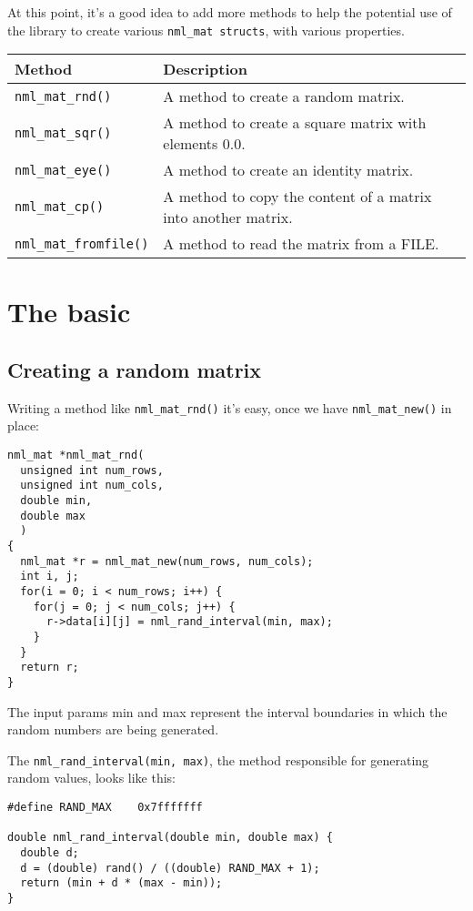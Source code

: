 At this point, it’s a good idea to add more methods to help the potential use of the library to create various {\tt nml\_mat structs}, with various properties.
\\

\begin{tabular}{l@{\quad}l}
Method & 	Description 
\\
\hline 
{\tt nml\_mat\_rnd()} & A method to create a random matrix.
\\
{\tt nml\_mat\_sqr()} & A method to create a square matrix with elements 0.0.
\\
{\tt nml\_mat\_eye()} & A method to create an identity matrix.
\\
{\tt nml\_mat\_cp()} & A method to copy the content of a matrix into another matrix.
\\
{\tt nml\_mat\_fromfile()} & A method to read the matrix from a FILE.
\end{tabular}

\section{The basic}

\subsection{Creating a random matrix}

Writing a method like {\tt nml\_mat\_rnd()} it’s easy, once we have {\tt nml\_mat\_new()} in place:

\begin{verbatim}
nml_mat *nml_mat_rnd(
  unsigned int num_rows, 
  unsigned int num_cols, 
  double min, 
  double max
  ) 
{
  nml_mat *r = nml_mat_new(num_rows, num_cols);
  int i, j;
  for(i = 0; i < num_rows; i++) {
    for(j = 0; j < num_cols; j++) {
      r->data[i][j] = nml_rand_interval(min, max);
    }
  }
  return r;
}
\end{verbatim}
The input params min and max represent the interval boundaries in which the random numbers are being generated.

The {\tt nml\_rand\_interval(min, max)}, the method responsible for generating random values, looks like this:
\\


\begin{verbatim}
#define	RAND_MAX	0x7fffffff

double nml_rand_interval(double min, double max) {
  double d;
  d = (double) rand() / ((double) RAND_MAX + 1);
  return (min + d * (max - min));
}
\end{verbatim}

